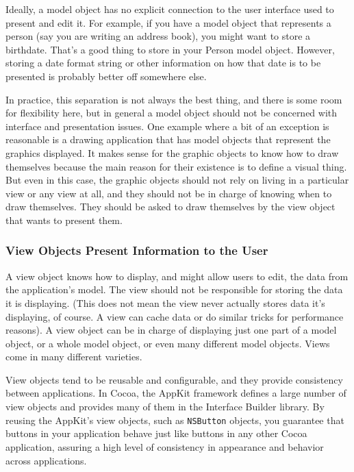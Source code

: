 Ideally, a model object has no explicit connection to the user interface used to
present and edit it. For example, if you have a model object that represents a
person (say you are writing an address book), you might want to store a
birthdate. That’s a good thing to store in your Person model object. However,
storing a date format string or other information on how that date is to be
presented is probably better off somewhere else.

In practice, this separation is not always the best thing, and there is some
room for flexibility here, but in general a model object should not be concerned
with interface and presentation issues. One example where a bit of an exception
is reasonable is a drawing application that has model objects that represent the
graphics displayed. It makes sense for the graphic objects to know how to draw
themselves because the main reason for their existence is to define a visual
thing. But even in this case, the graphic objects should not rely on living in a
particular view or any view at all, and they should not be in charge of knowing
when to draw themselves. They should be asked to draw themselves by the view
object that wants to present them.

\subsubsection{View Objects Present Information to the User}

A view object knows how to display, and might allow users to edit, the data from
the application’s model. The view should not be responsible for storing the data
it is displaying. (This does not mean the view never actually stores data it’s
displaying, of course. A view can cache data or do similar tricks for
performance reasons). A view object can be in charge of displaying just one part
of a model object, or a whole model object, or even many different model
objects. Views come in many different varieties.

View objects tend to be reusable and configurable, and they provide consistency
between applications. In Cocoa, the AppKit framework defines a large number of
view objects and provides many of them in the Interface Builder library. By
reusing the AppKit’s view objects, such as \texttt{NSButton} objects, you
guarantee that buttons in your application behave just like buttons in any other
Cocoa application, assuring a high level of consistency in appearance and
behavior across applications.

